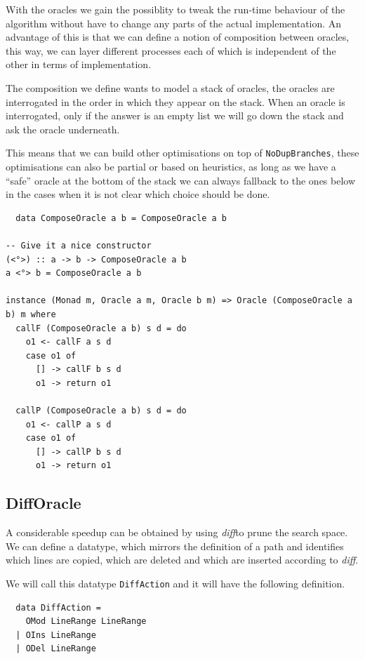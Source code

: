 \documentclass[11pt, titlepage]{article}
\newcommand{\diff}{\emph{diff}}
\begin{document}
With the oracles we gain the possiblity to tweak the run-time behaviour of the 
algorithm without have to change any parts of the actual implementation.
An advantage of this is that we can define a notion of 
composition between oracles, this way, we can layer different processes each of 
which is independent of the other in terms of implementation.

The composition we define wants to model a stack of oracles, the oracles are 
interrogated in the order in which they appear on the stack. When an oracle is 
interrogated, only if the answer is an empty list we will go down the stack and 
ask the oracle underneath. 

This means that we can build other optimisations on top of 
\texttt{NoDupBranches}, these optimisations can also be partial or based on 
heuristics, as long as we have a ``safe'' oracle at the bottom of the stack we 
can always fallback to the ones below in the cases when it is not clear which 
choice should be done.


\begin{verbatim}
  data ComposeOracle a b = ComposeOracle a b

-- Give it a nice constructor
(<°>) :: a -> b -> ComposeOracle a b
a <°> b = ComposeOracle a b

instance (Monad m, Oracle a m, Oracle b m) => Oracle (ComposeOracle a b) m where
  callF (ComposeOracle a b) s d = do
    o1 <- callF a s d
    case o1 of
      [] -> callF b s d
      o1 -> return o1

  callP (ComposeOracle a b) s d = do
    o1 <- callP a s d
    case o1 of
      [] -> callP b s d
      o1 -> return o1
\end{verbatim}

\subsection{DiffOracle}
A considerable speedup can be obtained by using \diff to prune the 
search space. We can define a datatype, which mirrors the definition of a path 
and identifies which lines are copied, which are deleted and which are inserted 
according to \diff.

We will call this datatype \texttt{DiffAction} and it will have the following 
definition.

\begin{verbatim}
  data DiffAction = 
    OMod LineRange LineRange
  | OIns LineRange
  | ODel LineRange  
\end{verbatim}
\end{document}
